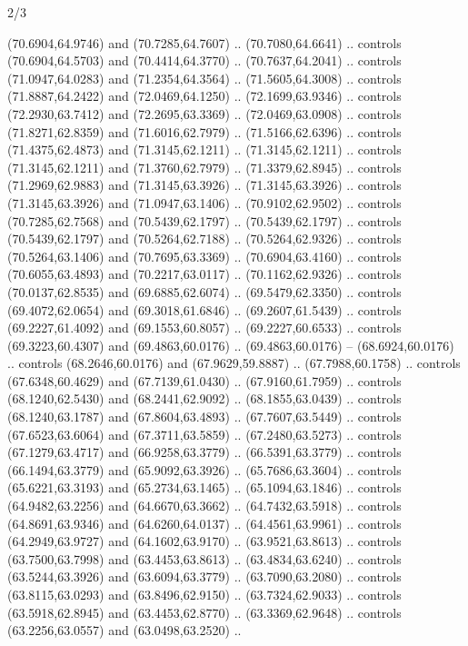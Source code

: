 \begin{flagdescription}{2/3}
\begin{scope}[xshift=0.3333\flaglength,yshift=0.5\flagwidth,scale=\flagwidth/711.3]
\begin{scope}
    (70.6904,64.9746) and (70.7285,64.7607) .. (70.7080,64.6641) .. controls
    (70.6904,64.5703) and (70.4414,64.3770) .. (70.7637,64.2041) .. controls
    (71.0947,64.0283) and (71.2354,64.3564) .. (71.5605,64.3008) .. controls
    (71.8887,64.2422) and (72.0469,64.1250) .. (72.1699,63.9346) .. controls
    (72.2930,63.7412) and (72.2695,63.3369) .. (72.0469,63.0908) .. controls
    (71.8271,62.8359) and (71.6016,62.7979) .. (71.5166,62.6396) .. controls
    (71.4375,62.4873) and (71.3145,62.1211) .. (71.3145,62.1211) .. controls
    (71.3145,62.1211) and (71.3760,62.7979) .. (71.3379,62.8945) .. controls
    (71.2969,62.9883) and (71.3145,63.3926) .. (71.3145,63.3926) .. controls
    (71.3145,63.3926) and (71.0947,63.1406) .. (70.9102,62.9502) .. controls
    (70.7285,62.7568) and (70.5439,62.1797) .. (70.5439,62.1797) .. controls
    (70.5439,62.1797) and (70.5264,62.7188) .. (70.5264,62.9326) .. controls
    (70.5264,63.1406) and (70.7695,63.3369) .. (70.6904,63.4160) .. controls
    (70.6055,63.4893) and (70.2217,63.0117) .. (70.1162,62.9326) .. controls
    (70.0137,62.8535) and (69.6885,62.6074) .. (69.5479,62.3350) .. controls
    (69.4072,62.0654) and (69.3018,61.6846) .. (69.2607,61.5439) .. controls
    (69.2227,61.4092) and (69.1553,60.8057) .. (69.2227,60.6533) .. controls
    (69.3223,60.4307) and (69.4863,60.0176) .. (69.4863,60.0176) --
    (68.6924,60.0176) .. controls (68.2646,60.0176) and (67.9629,59.8887) ..
    (67.7988,60.1758) .. controls (67.6348,60.4629) and (67.7139,61.0430) ..
    (67.9160,61.7959) .. controls (68.1240,62.5430) and (68.2441,62.9092) ..
    (68.1855,63.0439) .. controls (68.1240,63.1787) and (67.8604,63.4893) ..
    (67.7607,63.5449) .. controls (67.6523,63.6064) and (67.3711,63.5859) ..
    (67.2480,63.5273) .. controls (67.1279,63.4717) and (66.9258,63.3779) ..
    (66.5391,63.3779) .. controls (66.1494,63.3779) and (65.9092,63.3926) ..
    (65.7686,63.3604) .. controls (65.6221,63.3193) and (65.2734,63.1465) ..
    (65.1094,63.1846) .. controls (64.9482,63.2256) and (64.6670,63.3662) ..
    (64.7432,63.5918) .. controls (64.8691,63.9346) and (64.6260,64.0137) ..
    (64.4561,63.9961) .. controls (64.2949,63.9727) and (64.1602,63.9170) ..
    (63.9521,63.8613) .. controls (63.7500,63.7998) and (63.4453,63.8613) ..
    (63.4834,63.6240) .. controls (63.5244,63.3926) and (63.6094,63.3779) ..
    (63.7090,63.2080) .. controls (63.8115,63.0293) and (63.8496,62.9150) ..
    (63.7324,62.9033) .. controls (63.5918,62.8945) and (63.4453,62.8770) ..
    (63.3369,62.9648) .. controls (63.2256,63.0557) and (63.0498,63.2520) ..

\end{scope}
\end{scope}
\end{flagdescription}
